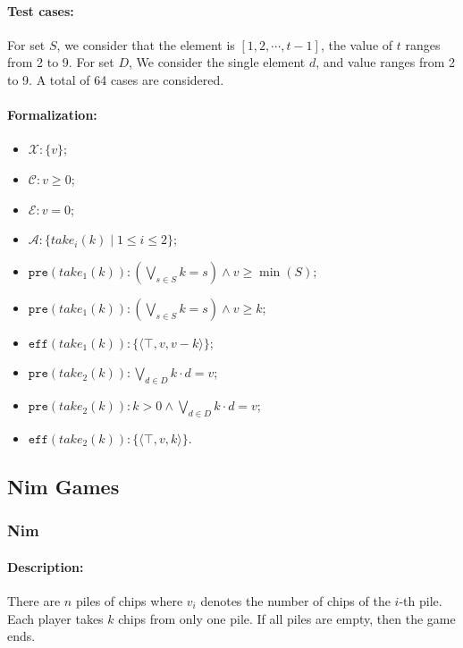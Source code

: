 \documentclass[review]{elsarticle}
\newcommand{\set}[1]{\{ #1 \}}
\newcommand{\tuple}[1]{\langle {#1} \rangle}
\newcommand{\true}{\top}
\newcommand{\statevar}{\mathcal{X}}
\newcommand{\act}{\mathcal{A}}
\newcommand{\constraint}{\mathcal{C}}
\newcommand{\estate}{\mathcal{E}}
\newcommand{\pre}{\mathtt{pre}}
\newcommand{\eff}{\mathtt{eff}}
\begin{document}
\paragraph{Test cases:} For set $S$, we consider that the element is $[1,2,\cdots,t-1]$, the value of $t$ ranges from 2 to 9. 
For set $D$, We consider the single element $d$, and value ranges from 2 to 9. 
A total of 64 cases are considered. 


\paragraph{Formalization:}

\begin{itemize}
	\item $\statevar: \set{v}$;
		\item $\constraint: v \ge 0$;
		\item $\estate: v=0$;
		\item $\act:\set{take_i(k){\mid} 1\le i\le2}$;
		\item $\pre(take_1(k)) :(\bigvee_{s \in S} k = s) \land v \geq \min(S) $;
		\item {\color{red}$\pre(take_1(k)) : (\bigvee_{s \in S} k = s) \land v \geq k$;}
		\item $\eff(take_1(k)) : \set{\tuple{\true, v, v-k}}$;
		\item $\pre(take_2(k)) :   \bigvee_{d \in D}k \cdot d = v$;
		\item {\color{red}$\pre(take_2(k)) : k > 0 \land \bigvee_{d \in D} k \cdot d = v$;}
		\item $\eff(take_2(k)) : \set{\tuple{\true, v, k}}$.
\end{itemize}

\subsection{Nim Games}


\subsubsection{Nim \protect\cite{Bou1901}}
\paragraph{Description:}
There are $n$ piles of chips where $v_i$ denotes the number of chips of the $i$-th pile.
Each player takes $k$ chips from only one pile. %
If all piles are empty, then the game ends.
\end{document}
